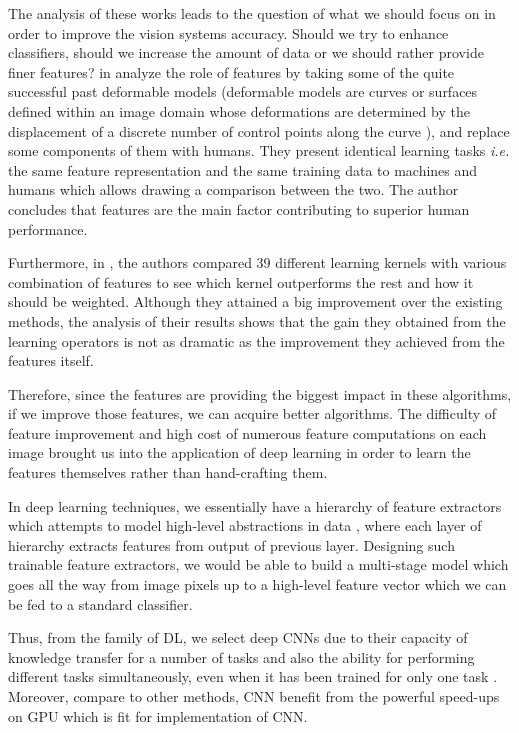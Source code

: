 \indent The analysis of these works leads to the question of what we should focus on in order to improve the vision systems accuracy. Should we try to enhance classifiers, should we increase the amount of data or we should rather provide finer features? \citeauthor*{parikh2010role} in \cite{parikh2010role} analyze the role of features by taking some of the quite successful past deformable models \cite{albrecht2015deformable} (deformable models are curves or surfaces defined within an image domain whose deformations are determined by the displacement of a discrete number of control points along the curve \cite{xu2000image}), and replace some components of them with humans. They present identical learning tasks \textit{i.e.} the same feature representation and the same training data to machines and humans which allows drawing a comparison between the two. The author concludes that features are the main factor contributing to superior human performance.

Furthermore, in \cite{gehler2009feature}, the authors compared 39 different learning kernels with various combination of features to see which kernel outperforms the rest and how it should be weighted. Although they attained a big improvement over the existing methods, the analysis of their results shows that the gain they obtained from the learning operators is not as dramatic as the improvement they achieved from the features itself. 

\indent Therefore, since the features are providing the biggest impact in these algorithms, if we improve those features, we can acquire better algorithms. The difficulty of feature improvement and high cost of numerous feature computations on each image brought us into the application of deep learning in order to learn the features themselves rather than hand-crafting them. 

In deep learning techniques, we essentially have a hierarchy of feature extractors which attempts to model high-level abstractions in data \cite{deng2014deep, bengio2009learning, bengio2013representation, arel2010deep, schmidhuber2015deep}, where each layer of hierarchy extracts features from output of previous layer. Designing such trainable feature extractors, we would be able to build a multi-stage model which goes all the way from image pixels up to a high-level feature vector which we can be fed to a standard classifier. 

Thus, from the family of DL, we select deep CNNs due to their capacity of knowledge transfer for a number of tasks and also the ability for performing different tasks simultaneously, even when it has been trained for only one task \cite{zhou2014learning}. Moreover, compare to other methods, CNN benefit from the powerful speed-ups on GPU which is fit for implementation of CNN. 

